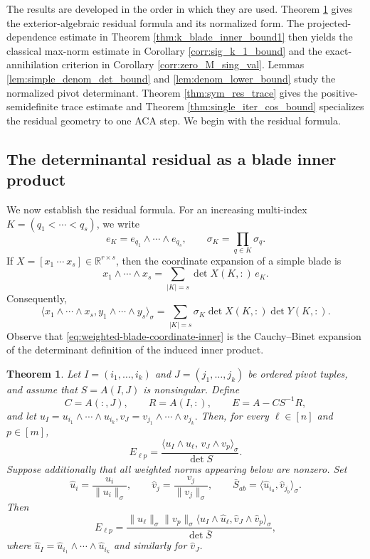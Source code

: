 \documentclass[11pt, preprint]{article}
\newtheorem{theorem}{Theorem}[section]
\newcommand{\R}{\mathbb{R}}
\newcommand{\inner}[1]{\langle #1\rangle}
\begin{document}
The results are developed in the order in which they are used. Theorem
\ref{thm:basic_res_form} gives the exterior-algebraic residual formula and its normalized form. The projected-dependence estimate in Theorem
\ref{thm:k_blade_inner_bound1} then yields the classical max-norm estimate in Corollary
\ref{corr:sig_k_1_bound} and the exact-annihilation criterion in Corollary
\ref{corr:zero_M_sing_val}. Lemmas \ref{lem:simple_denom_det_bound} and
\ref{lem:denom_lower_bound} study the normalized pivot determinant. Theorem
\ref{thm:sym_res_trace} gives the positive-semidefinite trace estimate and  Theorem
\ref{thm:single_iter_cos_bound} specializes the residual geometry to one ACA step. We begin with the residual formula.

\subsection{The determinantal residual as a blade inner product}\label{sec:main_useful_lemma}

We now establish the residual formula. For an increasing multi-index
$K=(q_1<\cdots<q_s)$, we write
\[
e_K=e_{q_1}\wedge\cdots\wedge e_{q_s},
\qquad
\sigma_K=\prod_{q\in K}\sigma_q.
\]
If $X=[x_1\ \cdots\ x_s]\in\R^{r\times s}$, then the coordinate expansion of a simple blade is
\begin{equation}\label{eq:wedge-coordinate-expansion}
x_1\wedge\cdots\wedge x_s
=
\sum_{|K|=s}\det X(K,:)\,e_K.
\end{equation}
Consequently,
\begin{equation}\label{eq:weighted-blade-coordinate-inner}
\inner{x_1\wedge\cdots\wedge x_s,
       y_1\wedge\cdots\wedge y_s}_\sigma
=
\sum_{|K|=s}\sigma_K\det X(K,:)\det Y(K,:).
\end{equation}
  Observe that \eqref{eq:weighted-blade-coordinate-inner} is the Cauchy--Binet expansion of the determinant definition of the induced inner product.

\begin{theorem} \label{thm:basic_res_form}
Let $I=(i_1,\ldots,i_k)$ and $J=(j_1,\ldots,j_k)$ be ordered pivot tuples, and assume that
$S=A(I,J)$ is nonsingular. Define
\[
C=A(:,J),\qquad R=A(I,:),\qquad E=A-CS^{-1}R,
\]
and let
\(
u_I=u_{i_1}\wedge\cdots\wedge u_{i_k}, 
v_J=v_{j_1}\wedge\cdots\wedge v_{j_k}.
\)
Then, for every $\ell\in[n]$ and $p\in[m]$,
\begin{equation}\label{eq:raw-blade-residual}
E_{\ell p}
=
\frac{\inner{u_I\wedge u_\ell,\,v_J\wedge v_p}_\sigma}
     {\det S}.
\end{equation}
Suppose additionally that all weighted norms appearing below are nonzero. Set
\[
\widehat u_i=\frac{u_i}{\|u_i\|_\sigma},
\qquad
\widehat v_j=\frac{v_j}{\|v_j\|_\sigma},
\qquad
\bar S_{ab}=\inner{\widehat u_{i_a},\widehat v_{j_b}}_\sigma.
\]
Then
\begin{equation}\label{eq:normalized-blade-residual}
E_{\ell p}
=
\frac{\|u_\ell\|_\sigma\|v_p\|_\sigma
\inner{\widehat u_I\wedge\widehat u_\ell,
       \widehat v_J\wedge\widehat v_p}_\sigma}
{\det\bar S},
\end{equation}
where $\widehat u_I=\widehat u_{i_1}\wedge\cdots\wedge\widehat u_{i_k}$ and similarly for $\widehat v_J$.
\end{theorem}
\end{document}
